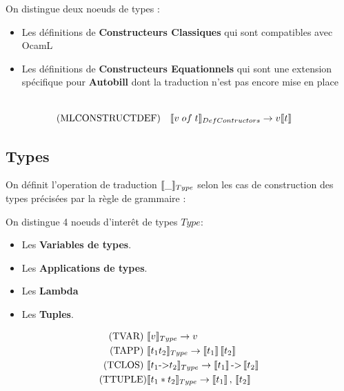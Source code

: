 \documentclass[
  12pt,
]{article}
\providecommand{\tightlist}{%
  \setlength{\itemsep}{0pt}\setlength{\parskip}{0pt}}
\begin{document}
On distingue deux noeuds de types :
\begin{itemize}
  \tightlist
  \item
        Les définitions de \textbf{Constructeurs Classiques} qui sont compatibles avec OcamL
  \item
        Les définitions de \textbf{Constructeurs Equationnels} qui sont une extension spécifique pour \textbf{Autobill} dont la traduction n'est pas encore mise en place
\end{itemize}


\begin{align*}
  \\\text{(MLCONSTRUCTDEF)} \quad & \llbracket v \; of \; t \rrbracket_{DefContructors}   \rightarrow   v\llbracket t \rrbracket                \\
\end{align*}

\pagebreak
\subsection{Types}\label{types-2}

On définit l'operation de traduction \(\llbracket \_ \rrbracket_{Type}\) selon les cas de construction
des types précisées par la règle de grammaire : 

On distingue 4 noeuds d'interêt de types $Type$:
\begin{itemize}
  \tightlist
  \item
        Les \textbf{Variables de types}.
  \item
        Les \textbf{Applications de types}.
  \item
        Les \textbf{Lambda}
  \item
        Les \textbf{Tuples}.
\end{itemize}
\begin{align*}
  \text{(TVAR) }  & \llbracket v \rrbracket_{Type} \rightarrow  v                                                                           \\
  \text{(TAPP) }  & \llbracket t_1 t_2 \rrbracket_{Type} \rightarrow  \llbracket t_1 \rrbracket \, \llbracket t_2 \rrbracket                        \\
  \text{(TCLOS) } & \llbracket t_1 \text{->} t_2 \rrbracket_{Type} \rightarrow  \llbracket t_1 \rrbracket \, \text{->} \, \llbracket t_2 \rrbracket \\
  \text{(TTUPLE)} & \llbracket t_1 * t_2 \rrbracket_{Type} \rightarrow  \llbracket t_1 \rrbracket \, , \, \llbracket t_2 \rrbracket                 
\end{align*}
\end{document}
